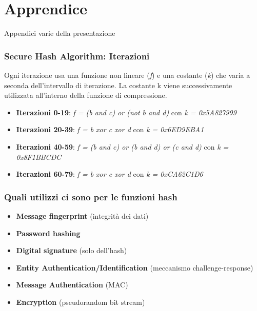 \section{Apprendice}

\begin{frame}[plain]
	\begin{center}
		{\Huge Appendici varie della presentazione}
	\end{center}
\end{frame}

\begin{frame}
	\frametitle{Secure Hash Algorithm: Iterazioni}

	Ogni iterazione usa una funzione non lineare (\textit{f}) e una costante (\textit{k}) che varia a seconda dell'intervallo di iterazione.
	La costante k viene successivamente utilizzata all'interno della funzione di compressione.

	\begin{itemize}
		\item \textbf{Iterazioni 0-19}: \textit{f = (b and c) or (not b and d)} con \textit{k = 0x5A827999}
		\item \textbf{Iterazioni 20-39}: \textit{f = b xor c xor d} con \textit{k = 0x6ED9EBA1}
		\item \textbf{Iterazioni 40-59}: \textit{f = (b and c) or (b and d) or (c and d)} con \textit{k = 0x8F1BBCDC}
		\item \textbf{Iterazioni 60-79}: \textit{f = b xor c xor d} con \textit{k = 0xCA62C1D6}
	\end{itemize}

\end{frame}

\begin{frame}
	\frametitle{Quali utilizzi ci sono per le funzioni hash}
	\begin{itemize}
		\item \textbf{Message fingerprint} (integrità dei dati)
		\item \textbf{Password hashing}
		\item \textbf{Digital signature} (solo dell'hash)
		\item \textbf{Entity Authentication/Identification} (meccanismo challenge-response)
		\item \textbf{Message Authentication} (MAC)
		\item \textbf{Encryption} (pseudorandom bit stream)
	\end{itemize}
\end{frame}

